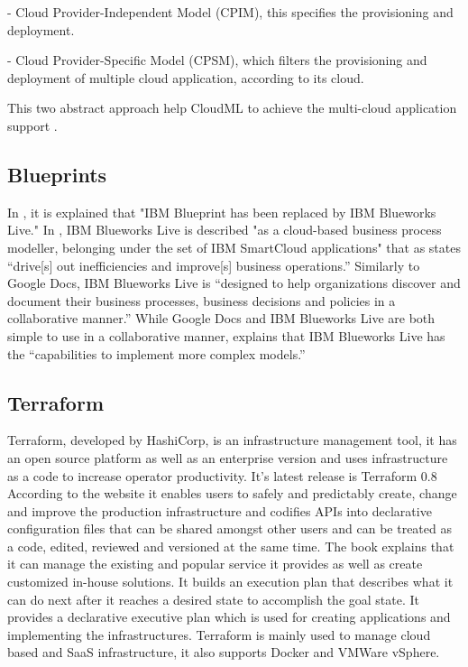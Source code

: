      - Cloud Provider-Independent Model (CPIM), this specifies the
       provisioning and deployment.
       
     - Cloud Provider-Specific Model (CPSM), which filters the
       provisioning and deployment of multiple cloud application,
       according to its cloud.

     This two abstract approach help CloudML to achieve the multi-cloud 
     application support \cite{www-cloudmlwiki}.

\subsection{Blueprints}

     In \cite{www-blueprints}, it is explained that "IBM Blueprint 
     has been replaced by IBM Blueworks Live." In 
     \cite{www-blueworks-live2}, IBM Blueworks Live is described "as 
     a cloud-based business process modeller, belonging under the set 
     of IBM SmartCloud applications" that as 
     \cite{www-blueworks-live} states ``drive[s] out inefficiencies 
     and improve[s] business operations.'' Similarly to Google Docs, 
     IBM Blueworks Live is ``designed to help organizations discover 
     and document their business processes, business decisions and 
     policies in a collaborative manner.'' While Google Docs and IBM 
     Blueworks Live are both simple to use in a collaborative manner, 
     \cite{www-blueworks-live2} explains that IBM Blueworks Live 
     has the ``capabilities to implement more complex models.''

\subsection{Terraform}

     Terraform, developed by HashiCorp, is an infrastructure
     management tool, it has an open source platform as well as an
     enterprise version and uses infrastructure as a code to increase
     operator productivity. It’s latest release is Terraform 0.8
     According to the website \cite{www-Terraform} it enables users
     to safely and predictably create, change and improve the
     production infrastructure and codifies APIs into declarative
     configuration files that can be shared amongst other users and
     can be treated as a code, edited, reviewed and versioned at the
     same time. The book \cite{www-terraform-book} explains that it
     can manage the existing and popular service it provides as well
     as create customized in-house solutions. It builds an execution
     plan that describes what it can do next after it reaches a
     desired state to accomplish the goal state. It provides a
     declarative executive plan which is used for creating
     applications and implementing the infrastructures. Terraform is
     mainly used to manage cloud based and SaaS infrastructure, it
     also supports Docker and VMWare vSphere.
     
